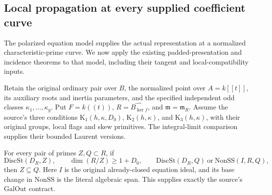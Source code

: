 \subsection{Local propagation at every supplied coefficient curve}
\label{sec:selmer-local-propagation}

The polarized equation model supplies the actual representation at a
normalized characteristic-prime curve.  We now apply the existing
padded-presentation and incidence theorems to that model, including
their tangent and local-compatibility inputs.

Retain the original ordinary pair over \(B\), the normalized point
over \(A=k[[t]]\), its auxiliary roots and inertia parameters, and
the specified independent odd classes \(\kappa_1,\ldots,\kappa_g\).
Put \(F=k((t))\), \(R=\widehat{B_{\ker f}}\), and
\(\mathfrak m=\mathfrak m_R\).  Assume the source's three conditions
\(\mathrm K_1(h,\kappa,D_0)\), \(\mathrm K_2(h,\kappa)\), and
\(\mathrm K_3(h,\kappa)\), with their original groups, local flags
and skew primitives.  The integral-limit comparison supplies their
bounded Laurent versions.

\begin{proposition}
\label{prop:selmer-local-propagation}
For every pair of primes \(Z,Q\subset R\), if
\[
 \mathrm{DiscSt}(D_R,Z),\qquad \dim(R/Z)\geq1+D_0,
 \qquad
 \mathrm{DiscSt}(D_R,Q)\ \text{or}\ \mathrm{NonSS}(I,R,Q),
\]
then \(Z\subseteq Q\).
Here \(I\) is the original already-closed equation ideal, and its
base change in \(\mathrm{NonSS}\) is the literal algebraic span.
This supplies exactly the source's \(\mathrm{GalOut}\) contract.
\end{proposition}

